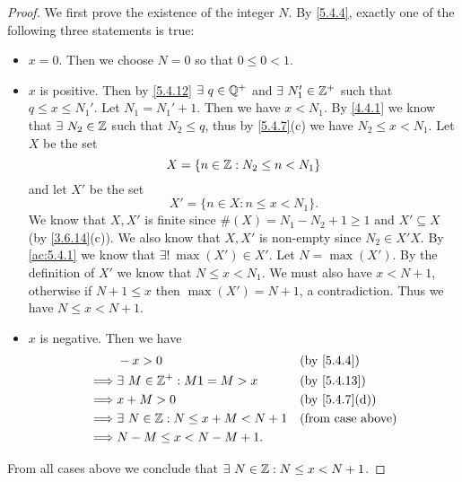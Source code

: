 \begin{proof}
  We first prove the existence of the integer \(N\).
  By \cref{5.4.4}, exactly one of the following three statements is true:
  \begin{itemize}
    \item \(x = 0\).
          Then we choose \(N = 0\) so that \(0 \leq 0 < 1\).
    \item \(x\) is positive.
          Then by \cref{5.4.12} \(\exists\ q \in \Q^+\) and \(\exists\ N_1' \in \mathbb{Z}^+\) such that \(q \leq x \leq N_1'\).
          Let \(N_1 = N_1' + 1\).
          Then we have \(x < N_1\).
          By \cref{4.4.1} we know that \(\exists\ N_2 \in \mathbb{Z}\) such that \(N_2 \leq q\), thus by \cref{5.4.7}(c) we have \(N_2 \leq x < N_1\).
          Let \(X\) be the set
          \[
            X = \{n \in \mathbb{Z} : N_2 \leq n < N_1\}
          \]
          and let \(X'\) be the set
          \[
            X' = \{n \in X : n \leq x < N_1\}.
          \]
          We know that \(X, X'\) is finite since \(\#(X) = N_1 - N_2 + 1 \geq 1\) and \(X' \subseteq X\) (by \cref{3.6.14}(c)).
          We also know that \(X, X'\) is non-empty since \(N_2 \in X'X\).
          By \cref{ac:5.4.1} we know that \(\exists!\ \max(X') \in X'\).
          Let \(N = \max(X')\).
          By the definition of \(X'\) we know that \(N \leq x < N_1\).
          We must also have \(x < N + 1\), otherwise if \(N + 1 \leq x\) then \(\max(X') = N + 1\), a contradiction.
          Thus we have \(N \leq x < N + 1\).
    \item \(x\) is negative.
          Then we have
          \begin{align*}
                     & -x > 0                                   &  & \text{(by \cref{5.4.4})}    \\
            \implies & \exists\ M \in \Z^+ : M1 = M > x         &  & \text{(by \cref{5.4.13})}   \\
            \implies & x + M > 0                                &  & \text{(by \cref{5.4.7}(d))} \\
            \implies & \exists\ N \in \Z : N \leq x + M < N + 1 &  & \text{(from case above)}    \\
            \implies & N - M \leq x < N - M + 1.
          \end{align*}
  \end{itemize}
  From all cases above we conclude that \(\exists\ N \in \mathbb{Z} : N \leq x < N + 1\).


\end{proof}
